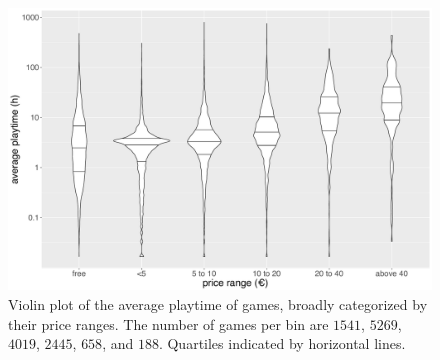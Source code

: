 



\begin{figure}[!t]
	\centering
	\includegraphics[width=1.0\columnwidth]{images/steam-cost-vs-playtime-non-sale.pdf}
	\caption{Violin plot of the average playtime of \steam games, broadly categorized by their price ranges. The number of games per bin are $1541$, $5269$, $4019$, $2445$, $658$, and $188$. Quartiles indicated by horizontal lines.}
\label{fig:steam-cost-vs-playtime-violin}
\end{figure}

